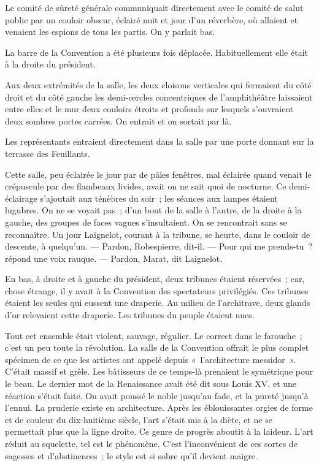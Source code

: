 \documentclass[french,twoside]{book} %
\begin{document}
Le comité de sûreté générale communiquait directement avec le comité de salut public par un couloir obscur, éclairé nuit et jour d’un réverbère, où allaient  et venaient les espions de tous les partis. On y parlait bas.\par
La barre de la Convention a été plusieurs fois déplacée. Habituellement elle était à la droite du président.\par
Aux deux extrémités de la salle, les deux cloisons verticales qui fermaient du côté droit et du côté gauche les demi-cercles concentriques de l’amphithéâtre laissaient entre elles et le mur deux couloirs étroits et profonds sur lesquels s’ouvraient deux sombres portes carrées. On entrait et on sortait par là.\par
Les représentants entraient directement dans la salle par une porte donnant sur la terrasse des Feuillants.\par
Cette salle, peu éclairée le jour par de pâles fenêtres, mal éclairée quand venait le crépuscule par des flambeaux livides, avait on ne sait quoi de nocturne. Ce demi-éclairage s’ajoutait aux ténèbres du soir ; les séances aux lampes étaient lugubres. On ne se voyait pas ; d’un bout de la salle à l’autre, de la droite à la gauche, des groupes de faces vagues s’insultaient. On se rencontrait sans se reconnaître. Un jour Laignelot, courant à la tribune, se heurte, dans le couloir de descente, à quelqu’un. — Pardon, Robespierre, dit-il. — Pour qui me prends-tu ? répond une voix rauque. — Pardon, Marat, dit Laignelot.\par
En bas, à droite et à gauche du président, deux tribunes étaient réservées ; car, chose étrange, il y avait à la Convention des spectateurs privilégiés. Ces tribunes étaient les seules qui eussent une draperie.  Au milieu de l’architrave, deux glands d’or relevaient cette draperie. Les tribunes du peuple étaient nues.\par
Tout cet ensemble était violent, sauvage, régulier. Le correct dans le farouche ; c’est un peu toute la révolution. La salle de la Convention offrait le plus complet spécimen de ce que les artistes ont appelé depuis « l’architecture messidor ». C’était massif et grêle. Les bâtisseurs de ce temps-là prenaient le symétrique pour le beau. Le dernier mot de la Renaissance avait été dit sous Louis XV, et une réaction s’était faite. On avait poussé le noble jusqu’au fade, et la pureté jusqu’à l’ennui. La pruderie existe en architecture. Après les éblouissantes orgies de forme et de couleur du dix-huitième siècle, l’art s’était mis à la diète, et ne se permettait plus que la ligne droite. Ce genre de progrès aboutit à la laideur. L’art réduit au squelette, tel est le phénomène. C’est l’inconvénient de ces sortes de sagesses et d’abstinences ; le style est si sobre qu’il devient maigre.\par
\end{document}
